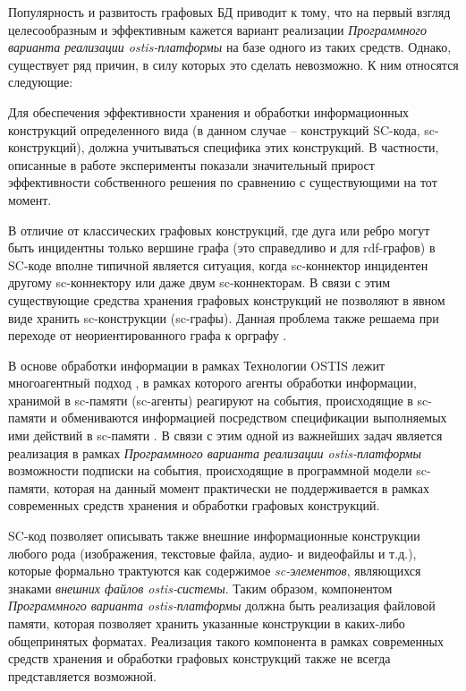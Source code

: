 Популярность и развитость графовых БД приводит к тому, что на первый взгляд целесообразным и эффективным кажется вариант реализации \textit{Программного варианта реализации ostis-платформы} на базе одного из таких средств. Однако, существует ряд причин, в силу которых это сделать невозможно. К ним относятся следующие:
\begin{textitemize}
    \item Для обеспечения эффективности хранения и обработки информационных конструкций определенного вида (в данном случае -- конструкций SC-кода, sc-конструкций), должна учитываться специфика этих конструкций. В частности, описанные в работе  эксперименты показали значительный прирост эффективности собственного решения по сравнению с существующими на тот момент.
    \item В отличие от классических графовых конструкций, где дуга или ребро могут быть инцидентны только вершине графа (это справедливо и для rdf-графов) в SC-коде вполне типичной является ситуация, когда sc-коннектор инцидентен другому sc-коннектору или даже двум sc-коннекторам. В связи с этим существующие средства хранения графовых конструкций не позволяют в явном виде хранить sc-конструкции (sc-графы). Данная проблема также решаема при переходе от неориентированного графа к орграфу .
    \item В основе обработки информации в рамках Технологии OSTIS лежит многоагентный подход \cite{iotti2018agent}, в рамках которого агенты обработки информации, хранимой в sc-памяти (sc-агенты) реагируют на события, происходящие в sc-памяти и обмениваются информацией посредством спецификации выполняемых ими действий в sc-памяти . В связи с этим одной из важнейших задач является реализация в рамках \textit{Программного варианта реализации ostis-платформы} возможности подписки на события, происходящие в программной модели sc-памяти, которая на данный момент практически не поддерживается в рамках современных средств хранения и обработки графовых конструкций.
    \item SC-код позволяет описывать также внешние информационные конструкции любого рода (изображения, текстовые файла, аудио- и видеофайлы и т.д.), которые формально трактуются как содержимое \textit{sc-элементов}, являющихся знаками \textit{внешних файлов ostis-системы}. Таким образом, компонентом \textit{Программного варианта ostis-платформы} должна быть реализация файловой памяти, которая позволяет хранить указанные конструкции в каких-либо общепринятых форматах. Реализация такого компонента в рамках современных средств хранения и обработки графовых конструкций также не всегда представляется возможной.
\end{textitemize}

